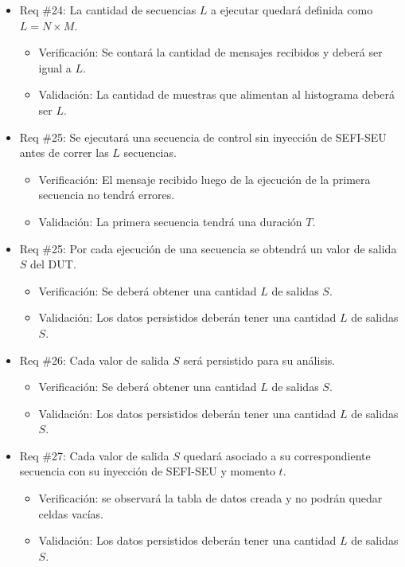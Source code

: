 \documentclass[
11pt, %
]{charter}
\begin{document}
\begin{itemize}
\item Req \#24: La cantidad de secuencias $ L $ a ejecutar quedará definida como $ L = N \times M $.
\begin{itemize}
    \item Verificación: Se contará la cantidad de mensajes recibidos y deberá ser igual a $ L $.
    \item Validación: La cantidad de muestras que alimentan al histograma deberá ser $ L $.
\end{itemize}

\item Req \#25: Se ejecutará una secuencia de control sin inyección de SEFI-SEU antes de correr las $ L $ secuencias.
\begin{itemize}
    \item Verificación: El mensaje recibido luego de la ejecución de la primera secuencia no tendrá errores.
    \item Validación: La primera secuencia tendrá una duración $ T $.
\end{itemize}

\item Req \#25: Por cada ejecución de una secuencia se obtendrá un valor de salida $ S $ del DUT.
\begin{itemize}
    \item Verificación: Se deberá obtener una cantidad $ L $ de salidas $ S $.
    \item Validación: Los datos persistidos deberán tener una cantidad $ L $ de salidas $ S $.
\end{itemize}

\item Req \#26: Cada valor de salida $ S $ será persistido para su análisis.
\begin{itemize}
    \item Verificación: Se deberá obtener una cantidad $ L $ de salidas $ S $.
    \item Validación: Los datos persistidos deberán tener una cantidad $ L $ de salidas $ S $.
\end{itemize}

\item Req \#27: Cada valor de salida $ S $ quedará asociado a su correspondiente secuencia con su inyección de SEFI-SEU y momento $ t $.
\begin{itemize}
    \item Verificación: se observará la tabla de datos creada y no podrán quedar celdas vacías.
    \item Validación: Los datos persistidos deberán tener una cantidad $ L $ de salidas $ S $.
\end{itemize}


\end{itemize}
\end{document}
